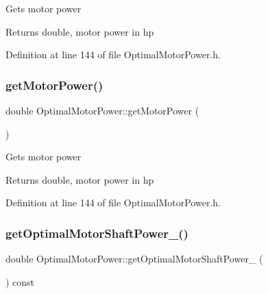 Gets motor power

\begin{DoxyReturn}{Returns}
double, motor power in hp 
\end{DoxyReturn}


Definition at line 144 of file Optimal\+Motor\+Power.\+h.

\mbox{\label{class_optimal_motor_power_af35a32c24df9198bcf0df5b8f6ea03a9}} 
\subsubsection{\texorpdfstring{get\+Motor\+Power()}{getMotorPower()}\hspace{0.1cm}{\footnotesize\ttfamily [3/3]}}
{\footnotesize\ttfamily double Optimal\+Motor\+Power\+::get\+Motor\+Power (\begin{DoxyParamCaption}{ }\end{DoxyParamCaption})\hspace{0.3cm}{\ttfamily [inline]}}

Gets motor power

\begin{DoxyReturn}{Returns}
double, motor power in hp 
\end{DoxyReturn}


Definition at line 144 of file Optimal\+Motor\+Power.\+h.

\mbox{\label{class_optimal_motor_power_af902365015880d5f11d865465672d7bb}} 
\subsubsection{\texorpdfstring{get\+Optimal\+Motor\+Shaft\+Power\+\_\+()}{getOptimalMotorShaftPower\_()}\hspace{0.1cm}{\footnotesize\ttfamily [1/3]}}
{\footnotesize\ttfamily double Optimal\+Motor\+Power\+::get\+Optimal\+Motor\+Shaft\+Power\+\_\+ (\begin{DoxyParamCaption}{ }\end{DoxyParamCaption}) const\hspace{0.3cm}{\ttfamily [inline]}}

